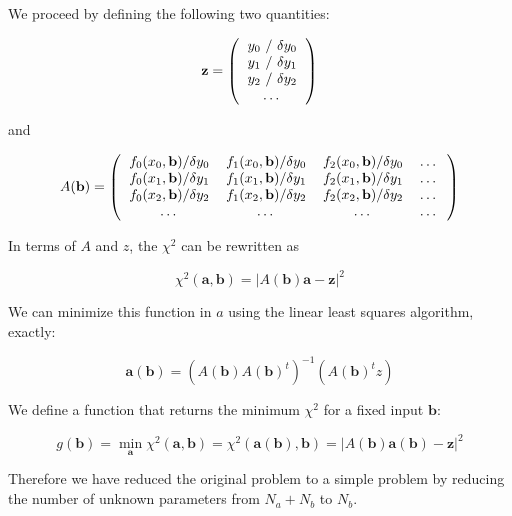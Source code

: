 \documentclass[justified,sixbynine]{tufte-book}
\theoremstyle{plain}%
\theoremstyle{definition}
\theoremstyle{remark}
\begin{document}
\begin{fullwidth}
We proceed by defining the following two quantities:

\begin{equation}
\mathbf{z} = \left(
\begin{tabular}{c}
$y_0$ / $\delta y_0$ \\
$y_1$ / $\delta y_1$ \\
$y_2$ / $\delta y_2$ \\
\dots
\end{tabular}
\right)
\end{equation}

and

\begin{equation}
A(\mathbf{b}) = \left(
\begin{tabular}{cccc}
$f_0(x_0,\mathbf{b})/\delta y_0$ &
$f_1(x_0,\mathbf{b})/\delta y_0$ &
$f_2(x_0,\mathbf{b})/\delta y_0$ & \dots \\
$f_0(x_1,\mathbf{b})/\delta y_1$ &
$f_1(x_1,\mathbf{b})/\delta y_1$ &
$f_2(x_1,\mathbf{b})/\delta y_1$ & \dots \\
$f_0(x_2,\mathbf{b})/\delta y_2$ &
$f_1(x_2,\mathbf{b})/\delta y_2$ &
$f_2(x_2,\mathbf{b})/\delta y_2$ & \dots \\
\dots & \dots & \dots &\dots 
\end{tabular}
\right)
\end{equation}

In terms of $A$ and $z$, the $\chi^2$ can be rewritten as

\begin{equation}
\chi^2(\mathbf{a},\mathbf{b}) = \left| A(\mathbf{b}) \mathbf{a} - \mathbf{z} \right|^2
\end{equation}

We can minimize this function in $a$ using the linear least squares algorithm, exactly:

\begin{equation}
\mathbf{a}(\mathbf{b}) = (A(\mathbf{b}) A(\mathbf{b})^t)^{-1}(A(\mathbf{b})^t z)
\end{equation}

We define a function that returns the minimum $\chi^2$ for a fixed input $\mathbf{b}$:

\begin{equation}
g(\mathbf{b}) =
\min_{\mathbf{a}}
\chi^2(\mathbf{a},\mathbf{b}) =
\chi^2(\mathbf{a}(\mathbf{b}),\mathbf{b}) = \left|
A(\mathbf{b})\mathbf{a}(\mathbf{b}) - \mathbf{z}
\right|^2
\end{equation}

Therefore we have reduced the original problem to a simple problem by reducing the number of unknown parameters from $N_a+N_b$ to $N_b$.


\end{fullwidth}
\end{document}
